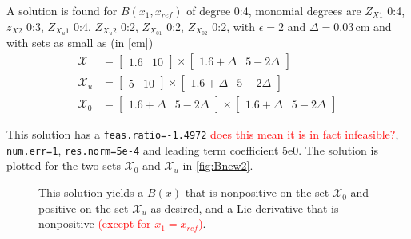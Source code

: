 A solution is found for $B(x_1,x_{ref})$ of degree 0:4, monomial degrees are $Z_{X1}$ 0:4, $z_{X2}$ 0:3, $Z_{X_u1}$ 0:4, $Z_{X_u2}$ 0:2, $Z_{X_01}$ 0:2, $Z_{X_02}$ 0:2, with $\epsilon=2$ and $\Delta=0.03$\,cm and with sets as small as (in [cm])
\begin{subequations}\label{eq:sets_case6}
	\begin{align}
		\mathcal{X} &= \begin{bmatrix} 1.6 & 10\end{bmatrix} \times \begin{bmatrix} 1.6+\Delta & 5-2\Delta\end{bmatrix}\\
		\mathcal{X}_u &= \begin{bmatrix} 5 & 10\end{bmatrix} \times \begin{bmatrix} 1.6+\Delta & 5-2\Delta\end{bmatrix}\\
		\mathcal{X}_0 &= \begin{bmatrix} 1.6+\Delta & 5-2\Delta\end{bmatrix} \times \begin{bmatrix} 1.6+\Delta & 5-2\Delta\end{bmatrix}
	\end{align}
\end{subequations}

This solution has a \texttt{feas.ratio=-1.4972} \textcolor{red}{does this mean it is in fact infeasible?}, \texttt{num.err=1}, \texttt{res.norm=5e-4} and leading term coefficient 5e0. The solution is plotted for the two sets $\mathcal{X}_0$ and $\mathcal{X}_u$ in \autoref{fig:Bnew2}.

\begin{figure}[H]
	\caption{This solution yields a $B(x)$ that is nonpositive on the set $\mathcal{X}_0$ and positive on the set $\mathcal{X}_u$ as desired, and a Lie derivative that is nonpositive \textcolor{red}{(except for $x_1=x_{ref}$)}.}
	\label{fig:Bnew2}
\end{figure}